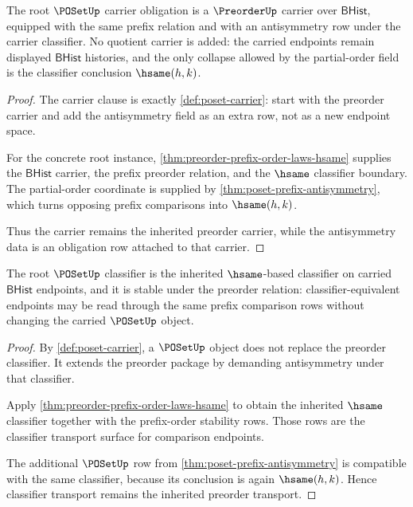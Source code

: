 \begin{theorem}
\label{thm:poset-root-carrier-obligation}
The root $\POSetUp$ carrier obligation is a $\PreorderUp$ carrier over
$\mathsf{BHist}$, equipped with the same prefix relation and with an
antisymmetry row under the carrier classifier. No quotient carrier is added:
the carried endpoints remain displayed $\mathsf{BHist}$ histories, and the
only collapse allowed by the partial-order field is the classifier conclusion
$\hsame(h,k)$.
\end{theorem}
\begin{proof}
The carrier clause is exactly \autoref{def:poset-carrier}: start with the
preorder carrier and add the antisymmetry field as an extra row, not as a new
endpoint space.

For the concrete root instance, \autoref{thm:preorder-prefix-order-laws-hsame}
supplies the $\mathsf{BHist}$ carrier, the prefix preorder relation, and the
$\hsame$ classifier boundary. The partial-order coordinate is supplied by
\autoref{thm:poset-prefix-antisymmetry}, which turns opposing prefix
comparisons into $\hsame(h,k)$.

Thus the carrier remains the inherited preorder carrier, while the
antisymmetry data is an obligation row attached to that carrier.
\end{proof}

\begin{theorem}
\label{thm:poset-root-classifier-obligation}
The root $\POSetUp$ classifier is the inherited $\hsame$-based classifier on
carried $\mathsf{BHist}$ endpoints, and it is stable under the preorder
relation: classifier-equivalent endpoints may be read through the same prefix
comparison rows without changing the carried $\POSetUp$ object.
\end{theorem}
\begin{proof}
By \autoref{def:poset-carrier}, a $\POSetUp$ object does not replace the
preorder classifier. It extends the preorder package by demanding
antisymmetry under that classifier.

Apply \autoref{thm:preorder-prefix-order-laws-hsame} to obtain the inherited
$\hsame$ classifier together with the prefix-order stability rows. Those rows
are the classifier transport surface for comparison endpoints.

The additional $\POSetUp$ row from \autoref{thm:poset-prefix-antisymmetry} is
compatible with the same classifier, because its conclusion is again
$\hsame(h,k)$. Hence classifier transport remains the inherited preorder
transport.
\end{proof}

